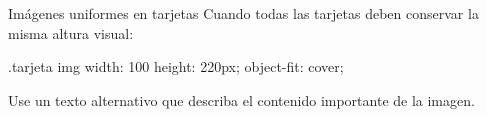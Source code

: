 \documentclass[aspectratio=169,11pt]{beamer}
\begin{document}
    \begin{frame}[fragile]{Imágenes uniformes en tarjetas}
        Cuando todas las tarjetas deben conservar la misma altura visual:

        \begin{csscodedark}
            .tarjeta img {
                width: 100%
                height: 220px;
                object-fit: cover;
            }
        \end{csscodedark}


        Use un texto alternativo que describa el contenido importante de la imagen.
    \end{frame}
\end{document}
